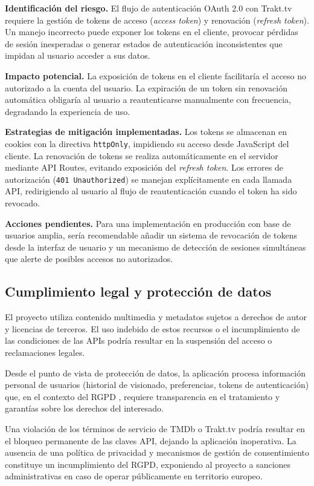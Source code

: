 \textbf{Identificación del riesgo.} El flujo de autenticación OAuth 2.0 con Trakt.tv requiere la gestión de tokens de acceso (\textit{access token}) y renovación (\textit{refresh token}). Un manejo incorrecto puede exponer los tokens en el cliente, provocar pérdidas de sesión inesperadas o generar estados de autenticación inconsistentes que impidan al usuario acceder a sus datos.

\textbf{Impacto potencial.} La exposición de tokens en el cliente facilitaría el acceso no autorizado a la cuenta del usuario. La expiración de un token sin renovación automática obligaría al usuario a reautenticarse manualmente con frecuencia, degradando la experiencia de uso.

\textbf{Estrategias de mitigación implementadas.} Los tokens se almacenan en cookies con la directiva \texttt{httpOnly}, impidiendo su acceso desde JavaScript del cliente. La renovación de tokens se realiza automáticamente en el servidor mediante API Routes, evitando exposición del \textit{refresh token}. Los errores de autorización (\texttt{401 Unauthorized}) se manejan explícitamente en cada llamada API, redirigiendo al usuario al flujo de reautenticación cuando el token ha sido revocado.

\textbf{Acciones pendientes.} Para una implementación en producción con base de usuarios amplia, sería recomendable añadir un sistema de revocación de tokens desde la interfaz de usuario y un mecanismo de detección de sesiones simultáneas que alerte de posibles accesos no autorizados.

\subsection{Cumplimiento legal y protección de datos}

El proyecto utiliza contenido multimedia y metadatos sujetos a derechos de autor y licencias de terceros. El uso indebido de estos recursos o el incumplimiento de las condiciones de las APIs podría resultar en la suspensión del acceso o reclamaciones legales.

Desde el punto de vista de protección de datos, la aplicación procesa información personal de usuarios (historial de visionado, preferencias, tokens de autenticación) que, en el contexto del RGPD \parencite{W3C:2023}, requiere transparencia en el tratamiento y garantías sobre los derechos del interesado.

Una violación de los términos de servicio de TMDb o Trakt.tv podría resultar en el bloqueo permanente de las claves API, dejando la aplicación inoperativa. La ausencia de una política de privacidad y mecanismos de gestión de consentimiento constituye un incumplimiento del RGPD, exponiendo al proyecto a sanciones administrativas en caso de operar públicamente en territorio europeo.

